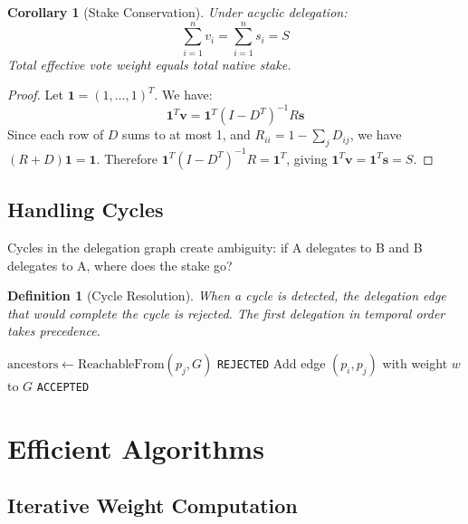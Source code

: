 \documentclass[11pt,a4paper]{article}
\newtheorem{definition}{Definition}
\newtheorem{corollary}{Corollary}
\begin{document}
\begin{corollary}[Stake Conservation]
Under acyclic delegation:
\[
\sum_{i=1}^{n} v_i = \sum_{i=1}^{n} s_i = S
\]
Total effective vote weight equals total native stake.
\end{corollary}

\begin{proof}
Let $\mathbf{1} = (1, \ldots, 1)^T$. We have:
\[
\mathbf{1}^T \mathbf{v} = \mathbf{1}^T (I - D^T)^{-1} R \mathbf{s}
\]
Since each row of $D$ sums to at most 1, and $R_{ii} = 1 - \sum_j D_{ij}$, we have $(R + D)\mathbf{1} = \mathbf{1}$. Therefore $\mathbf{1}^T (I - D^T)^{-1} R = \mathbf{1}^T$, giving $\mathbf{1}^T \mathbf{v} = \mathbf{1}^T \mathbf{s} = S$.
\end{proof}

\subsection{Handling Cycles}

Cycles in the delegation graph create ambiguity: if A delegates to B and B delegates to A, where does the stake go?

\begin{definition}[Cycle Resolution]
When a cycle is detected, the delegation edge that would complete the cycle is rejected. The first delegation in temporal order takes precedence.
\end{definition}

\begin{algorithm}
\caption{Cycle Detection on Delegation}
\begin{algorithmic}[1]
    \State $\text{ancestors} \gets \text{ReachableFrom}(p_j, G)$
        \State \Return \texttt{REJECTED} 
    \EndIf
    \State Add edge $(p_i, p_j)$ with weight $w$ to $G$
    \State \Return \texttt{ACCEPTED}
\EndProcedure
\end{algorithmic}
\end{algorithm}

\section{Efficient Algorithms}

\subsection{Iterative Weight Computation}
\end{document}
